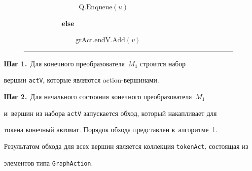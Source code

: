 \begin{figure}[b]
\ \ \ \ \ \ \ \ \ \ \ \ \ \ \ \ {$\mathrm{Q.Enqueue}(u)$}







\ \ \ \ \ \ \ \ \ \ \ \textbf{else}





\  \ \ \ \ \ \ \ \ \ \ \  \ \ \ {$\mathrm{grAct.endV.Add}(v)$}





\vspace*{3pt}





\hrule





\vspace*{3pt}
















\end{figure}





\textbf{{Шаг 1.}}\ Для конечного преобразователя~$M_1$ строится набор 


вершин \verb"actV", которые являются action-вер\-ши\-нами.





\textbf{{Шаг 2.}}\ Для начального состояния конечного преобразователя~$M_1$ 


и~вершин из набора \verb"actV" запускается обход, который накапливает для 


токена конечный автомат. Порядок обхода представлен в~алгоритме~1. 


Результатом обхода для всех вершин является коллекция \verb"tokenAct", состоящая из 


элементов типа \verb"GraphAction".














